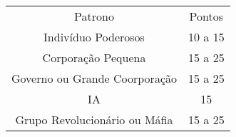\documentclass[a4paper]{article}
\begin{document}
\begin{description}
\begin{table}[h]
 \centering
 {\renewcommand\arraystretch{1.25}
 \begin{tabular}{ l l }
  \cline{1-1}\cline{2-2}  
    \multicolumn{1}{|c|}{Patrono \centering } &
    \multicolumn{1}{c|}{Pontos \centering }
  \\  
  \cline{1-1}\cline{2-2}  
    \multicolumn{1}{|c|}{Indivíduo Poderosos \centering } &
    \multicolumn{1}{c|}{10 a 15 \centering }
  \\  
  \cline{1-1}\cline{2-2}  
    \multicolumn{1}{|c|}{Corporação Pequena \centering } &
    \multicolumn{1}{c|}{15 a 25 \centering }
  \\  
  \cline{1-1}\cline{2-2}  
    \multicolumn{1}{|c|}{Governo ou Grande Coorporação \centering } &
    \multicolumn{1}{c|}{15 a 25 \centering }
  \\  
  \cline{1-1}\cline{2-2}  
    \multicolumn{1}{|c|}{IA \centering } &
    \multicolumn{1}{c|}{15 \centering }
  \\  
  \cline{1-1}\cline{2-2}  
    \multicolumn{1}{|c|}{Grupo Revolucionário ou Máfia \centering } &
    \multicolumn{1}{c|}{15 a 25 \centering }
  \\  
  \hline

 \end{tabular} }
\end{table}


\end{description}
\end{document}
